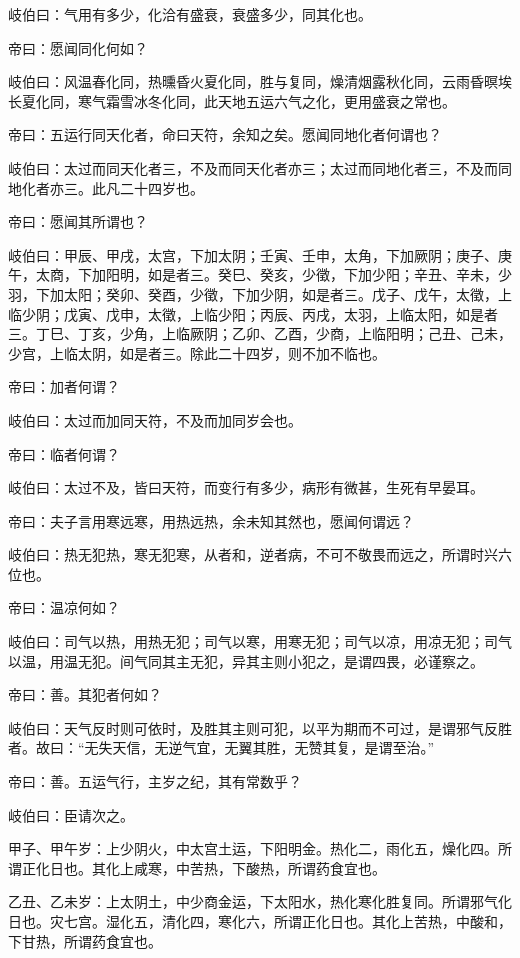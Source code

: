 \documentclass{article}%
\begin{document}
岐伯曰：气用有多少，化洽有盛衰，衰盛多少，同其化也。

帝曰：愿闻同化何如？

岐伯曰：风温春化同，热曛昏火夏化同，胜与复同，燥清烟露秋化同，云雨昏暝埃长夏化同，寒气霜雪冰冬化同，此天地五运六气之化，更用盛衰之常也。

帝曰：五运行同天化者，命曰天符，余知之矣。愿闻同地化者何谓也？

岐伯曰：太过而同天化者三，不及而同天化者亦三；太过而同地化者三，不及而同地化者亦三。此凡二十四岁也。

帝曰：愿闻其所谓也？

岐伯曰：甲辰、甲戌，太宫，下加太阴；壬寅、壬申，太角，下加厥阴；庚子、庚午，太商，下加阳明，如是者三。癸巳、癸亥，少徵，下加少阳；辛丑、辛未，少羽，下加太阳；癸卯、癸酉，少徵，下加少阴，如是者三。戊子、戊午，太徵，上临少阴；戊寅、戊申，太徵，上临少阳；丙辰、丙戌，太羽，上临太阳，如是者三。丁巳、丁亥，少角，上临厥阴；乙卯、乙酉，少商，上临阳明；己丑、己未，少宫，上临太阴，如是者三。除此二十四岁，则不加不临也。

帝曰：加者何谓？

岐伯曰：太过而加同天符，不及而加同岁会也。

帝曰：临者何谓？

岐伯曰：太过不及，皆曰天符，而变行有多少，病形有微甚，生死有早晏耳。

帝曰：夫子言用寒远寒，用热远热，余未知其然也，愿闻何谓远？

岐伯曰：热无犯热，寒无犯寒，从者和，逆者病，不可不敬畏而远之，所谓时兴六位也。

帝曰：温凉何如？

岐伯曰：司气以热，用热无犯；司气以寒，用寒无犯；司气以凉，用凉无犯；司气以温，用温无犯。间气同其主无犯，异其主则小犯之，是谓四畏，必谨察之。

帝曰：善。其犯者何如？

岐伯曰：天气反时则可依时，及胜其主则可犯，以平为期而不可过，是谓邪气反胜者。故曰：“无失天信，无逆气宜，无翼其胜，无赞其复，是谓至治。”

帝曰：善。五运气行，主岁之纪，其有常数乎？

岐伯曰：臣请次之。

甲子、甲午岁：上少阴火，中太宫土运，下阳明金。热化二，雨化五，燥化四。所谓正化日也。其化上咸寒，中苦热，下酸热，所谓药食宜也。

乙丑、乙未岁：上太阴土，中少商金运，下太阳水，热化寒化胜复同。所谓邪气化日也。灾七宫。湿化五，清化四，寒化六，所谓正化日也。其化上苦热，中酸和，下甘热，所谓药食宜也。
\end{document}
